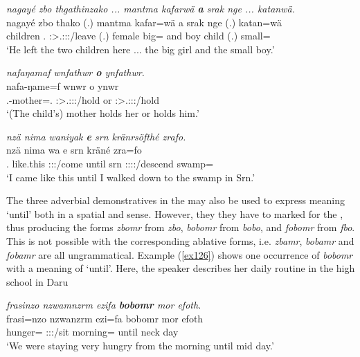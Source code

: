 \begin{exe}
	\ex \emph{nagayé zbo thgathinzako ... mantma kafarwä \textbf{a} srak nge ... katanwä.}\\
	\gll nagayé zbo thako (.) mantma kafar=wä a srak nge (.) katan=wä\\
	children \Prox{}.\All{} \Stsg:\Sbj>\Stdu.\Obj:\Pst:\Pfv:\Andat/leave (.) female big=\Emph{} and boy child (.) small=\Emph{}\\
	\trans `He left the two children here ... the big girl and the small boy.' 
	\label{ex123}
\end{exe}
\begin{exe}
	\ex \emph{nafaŋamaf wnfathwr \textbf{o} ynfathwr.}\\
	\gll nafa-ŋame=f wnwr o ynwr\\
	\Third.\Poss{}-mother=\Erg.\Sg{} \Stsg:\Sbj>\Tsg.\F:\Obj:\Nonpast:\Venit/hold or \Stsg:\Sbj>\Tsg.\Masc:\Obj:\Nonpast:\Venit/hold\\
	\trans `(The child's) mother holds her or holds him.' 
	\label{ex124}
\end{exe}
\begin{exe}
	\ex \emph{nzä nima waniyak \textbf{e} srn kränrsöfthé zrafo.}\\
	\gll nzä nima wa e srn kräné zra=fo\\
	\Fsg{}.\Abs{} {like.this} \Fsg:\Sbj:\Nonpast:\Ipfv/come until srn \Fsg:\Sbj:\Irr:\Pfv:\Venit/descend swamp=\All{}\\
	\trans `I came like this until I walked down to the swamp in Srn.'\\
	\label{ex125}
\end{exe}

The three adverbial demonstratives in the   may also be used to express meaning `until' both in a spatial and  sense. However, they they have to marked for the  , thus producing the forms \emph{zbomr} from \emph{zbo}, \emph{bobomr} from \emph{bobo}, and \emph{fobomr} from \emph{fbo}. This is not possible with the corresponding ablative forms, i.e. \emph{zbamr}, \emph{bobamr} and \emph{fobamr} are all ungrammatical. Example (\ref{ex126}) shows one occurrence of \emph{bobomr} with a  meaning of `until'. Here, the speaker describes her daily routine in the high school in Daru

\begin{exe}
	\ex \emph{frasinzo nzwamnzrm ezifa \textbf{bobomr} mor efoth.}\\
	\gll frasi=nzo nzwanzrm ezi=fa bobomr mor efoth\\
	hunger=\Only{} \Fpl:\Sbj:\Pst:\Dur/sit morning=\Abl{} until neck day\\
	\trans `We were staying very hungry from the morning until mid day.'\\
	\label{ex126}
\end{exe}

